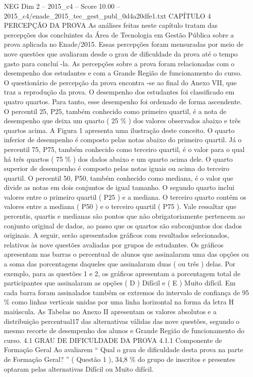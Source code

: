 \begin{textsample}{NEG Dim 2 – 2015\_c4 – Score 10.00 – 2015\_c4/enade\_2015\_tec\_gest\_publ\_0d4a20dfe1.txt}  \label{ex:f2_neg_349}
CAPÍTULO 4 PERCEPÇÃO DA PROVA As análises feitas neste capítulo tratam das percepções dos concluintes da Área de Tecnologia em Gestão Pública sobre a prova aplicada no Enade/2015.
Essas percepções foram mensuradas por meio de nove questões que avaliaram desde o grau de dificuldade da prova até o tempo gasto para concluí -la.
As percepções sobre a prova foram relacionadas com o desempenho dos estudantes e com a Grande Região de funcionamento do curso.
O questionário de percepção da prova encontra -se ao final do Anexo VII, que traz a reprodução da prova.
O desempenho dos estudantes foi classificado em quatro quartos.
Para tanto, esse desempenho foi ordenado de forma ascendente.
O percentil 25, P25, também conhecido como primeiro quartil, é a nota de desempenho que deixa um quarto ( 25 \% ) dos valores observados abaixo e três quartos acima.
A Figura 1 apresenta uma ilustração deste conceito.
O quarto inferior de desempenho é composto pelas notas abaixo do primeiro quartil.
Já o percentil 75, P75, também conhecido como terceiro quartil, é o valor para o qual há três quartos ( 75 \% ) dos dados abaixo e um quarto acima dele.
O quarto superior de desempenho é composto pelas notas iguais ou acima do terceiro quartil.
O percentil 50, P50, também conhecido como mediana, é o valor que divide as notas em dois conjuntos de igual tamanho.
O segundo quarto inclui valores entre o primeiro quartil ( P25 ) e a mediana.
O terceiro quarto contém os valores entre a mediana ( P50 ) e o terceiro quartil ( P75 ).
Vale ressaltar que percentis, quartis e medianas são pontos que não obrigatoriamente pertencem ao conjunto original de dados, ao passo que os quartos são subconjuntos dos dados originais.
A seguir, serão apresentados gráficos com resultados selecionados, relativos às nove questões avaliadas por grupos de estudantes.
Os gráficos apresentam nas barras o percentual de alunos que assinalaram uma das opções ou a soma das porcentagens daqueles que assinalaram duas ( ou três ) delas.
Por exemplo, para as questões 1 e 2, os gráficos apresentam a porcentagem total de participantes que assinalaram as opções ( D ) Difícil e ( E ) Muito difícil.
Em cada barra foram assinalados também os extremos do intervalo de confiança de 95 \% como linhas verticais unidas por uma linha horizontal na forma da letra H maiúscula.
As Tabelas no Anexo II apresentam os valores absolutos e a distribuição percentual17 das alternativas válidas das nove questões, segundo o mesmo recorte de desempenho dos alunos e Grande Região de funcionamento do curso. 4.1 GRAU DE DIFICULDADE DA PROVA 4.1.1 Componente de Formação Geral Ao avaliarem “ Qual o grau de dificuldade desta prova na parte de Formação Geral? ” ( Questão 1 ), 34,8 \% do grupo de inscritos e presentes optaram pelas alternativas Difícil ou Muito difícil.

\end{textsample}
